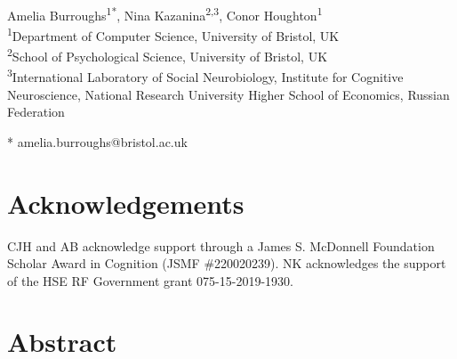 \documentclass[10pt,letterpaper]{article}
\date{}
\begin{document}
\vspace*{0.2in}

\begin{flushleft}
{\Large
\textbf{} 
}
\newline
\\
Amelia Burroughs\textsuperscript{1*},
Nina Kazanina\textsuperscript{2,3},
Conor Houghton\textsuperscript{1}
\\
\bigskip
\textsuperscript{1}Department of Computer Science, University of
Bristol, UK\\ \textsuperscript{2}School of Psychological Science,
University of Bristol, UK\\ \textsuperscript{3}International
Laboratory of Social Neurobiology, Institute for Cognitive
Neuroscience, National Research University Higher School of Economics,
Russian Federation \\
\bigskip

* amelia.burroughs@bristol.ac.uk

\end{flushleft}


\section*{Acknowledgements}
CJH and AB acknowledge support through a James S. McDonnell Foundation
Scholar Award in Cognition (JSMF \#220020239). NK acknowledges the
support of the HSE RF Government grant 075-15-2019-1930.

\section*{Abstract}
\end{document}
